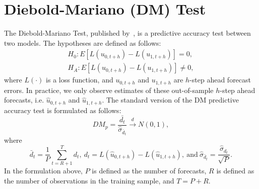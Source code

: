 \section{Diebold-Mariano (DM) Test}
\label{sec:dmtest}
The Diebold-Mariano Test, published by~\textcite[hereafter DM]{Diebold1994}, is a predictive accuracy test between two models. The hypotheses are defined as follows:
\begin{align*}
	H_0 : E\left[L(u_{0,t+h}) - L(u_{1,t+h})\right] = 0, \\
	H_A : E\left[L(u_{0,t+h}) - L(u_{1,t+h})\right] \neq 0,
\end{align*}
where $L(\cdot)$ is a loss function, and $u_{0,t+h}$ and $u_{1,t+h}$ are $h$-step ahead forecast errors. In practice, we only observe estimates of these out-of-sample $h$-step ahead forecasts, i.e. $\hat{u}_{0,t+h}$ and $\hat{u}_{1,t+h}$. The standard version of the DM predictive accuracy test is formulated as follows:
\begin{equation}
	DM_p = \frac{\bar{d_t}}{\hat{\sigma}_{\bar{d}_t}} \overset{d}{\rightarrow} N(0,1),
\end{equation}
where
\begin{equation}
	\bar{d}_t = \frac{1}{P} \sum_{t=R+1}^{T} d_t,\ d_t = L(\hat{u}_{0,t+h}) - L(\hat{u}_{1,t+h}),\ \text{and}\ \hat{\sigma}_{\bar{d}_t} = \frac{\hat{\sigma}_{d_t}}{\sqrt{P}}.
\end{equation}
In the formulation above, $P$ is defined as the number of forecasts, $R$ is defined as the number of observations in the training sample, and $T = P + R$. 
